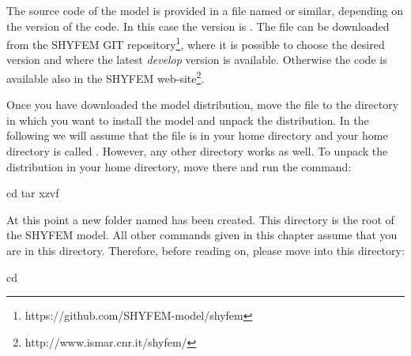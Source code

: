 
%
%
%
%
%
%
%

The source code of the model is provided in a file named \ttt{\shydist}
or similar, depending on the version of the code. In this case the
version is \version.  The file can be downloaded from the SHYFEM GIT
repository\footnote{https://github.com/SHYFEM-model/shyfem}, where
it is possible to choose the desired version and where the latest
\textit{develop} version is available.  Otherwise the code is available
also in the SHYFEM web-site\footnote{http://www.ismar.cnr.it/shyfem/}.

Once you have downloaded the model distribution, move the file to
the directory in which you want to install the model and unpack the
distribution. In the following we will assume that the file is in your
home directory and your home directory is called \ttt{\basedir}. However,
any other directory works as well. To unpack the distribution
in your home directory, move there and run the command:

\begin{codem}
    cd \basedir
    tar xzvf \shydist
\end{codem}

At this point a new folder named \ttt{\shydir} has been created. 
This directory is the root of the SHYFEM model. All other commands
given in this chapter assume that you are in this directory. 
Therefore, before reading on, please move into this directory:

\begin{codem}
    cd \shydir
\end{codem}

